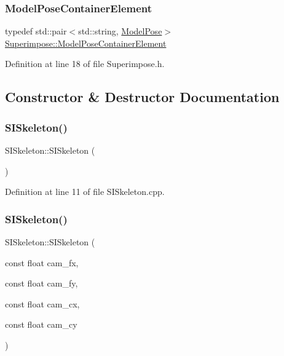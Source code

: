 \subsubsection{\texorpdfstring{Model\+Pose\+Container\+Element}{ModelPoseContainerElement}}
{\footnotesize\ttfamily typedef std\+::pair$<$std\+::string, \mbox{\hyperlink{classSuperimpose_a85d40a5caf19f486d1e0c15c0a025378}{Model\+Pose}}$>$ \mbox{\hyperlink{classSuperimpose_a1e02e0225687b42296dcfee4eadf8a55}{Superimpose\+::\+Model\+Pose\+Container\+Element}}\hspace{0.3cm}{\ttfamily [inherited]}}



Definition at line 18 of file Superimpose.\+h.



\subsection{Constructor \& Destructor Documentation}
\mbox{\label{classSISkeleton_a52ad426ff55dacaea6fb30470a7e67ff}} 
\subsubsection{\texorpdfstring{S\+I\+Skeleton()}{SISkeleton()}\hspace{0.1cm}{\footnotesize\ttfamily [1/2]}}
{\footnotesize\ttfamily S\+I\+Skeleton\+::\+S\+I\+Skeleton (\begin{DoxyParamCaption}{ }\end{DoxyParamCaption})}



Definition at line 11 of file S\+I\+Skeleton.\+cpp.

\mbox{\label{classSISkeleton_a3d968efd0700f20a93064957f15bf40e}} 
\subsubsection{\texorpdfstring{S\+I\+Skeleton()}{SISkeleton()}\hspace{0.1cm}{\footnotesize\ttfamily [2/2]}}
{\footnotesize\ttfamily S\+I\+Skeleton\+::\+S\+I\+Skeleton (\begin{DoxyParamCaption}\item[{const float}]{cam\+\_\+fx,  }\item[{const float}]{cam\+\_\+fy,  }\item[{const float}]{cam\+\_\+cx,  }\item[{const float}]{cam\+\_\+cy }\end{DoxyParamCaption})}



